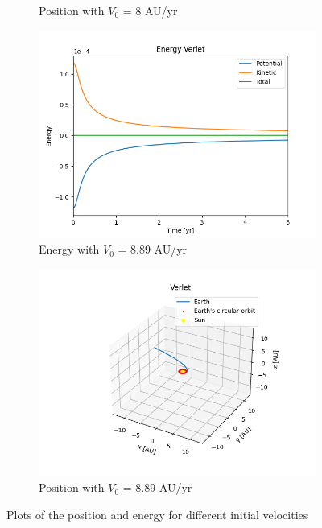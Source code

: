 \begin{figure}[H]
\begin{subfigure}{0.48\linewidth}
			\caption{Position with $V_0$ = 8 AU/yr}
		\end{subfigure}
		\begin{subfigure}{0.48\linewidth}
			\includegraphics[width=1.15\linewidth]{Figure/EscVel_E_889.png}
			\caption{Energy with $V_0$ = 8.89 AU/yr}
		\end{subfigure}
		\begin{subfigure}{0.48\linewidth}
			\includegraphics[width=1.15\linewidth]{Figure/EscVel_P_889.png}
			\caption{Position with $V_0$ = 8.89 AU/yr}
		\end{subfigure}
		\caption{Plots of the position and energy for different initial velocities}
		\label{EscVel_trial}
	\end{figure}
	
